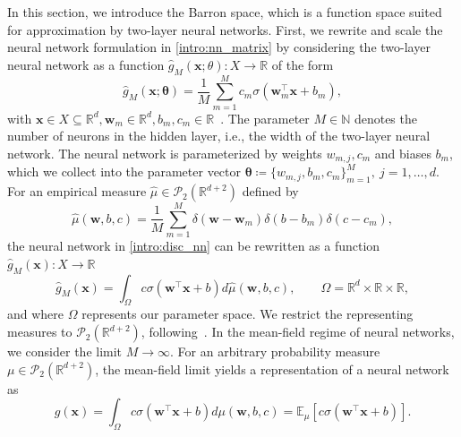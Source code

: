 \documentclass[a4paper, 11pt]{article}
\newcommand{\R}{\mathbb{R}}
\newcommand{\Pw}{\mathcal{P}_{2}\left( \R^{d+2} \right) }
\theoremstyle{plain} %
\begin{document}
	In this section, we introduce the Barron space, which is a function space suited for approximation by two-layer neural networks. First, we rewrite and scale the neural network formulation in \eqref{intro:nn_matrix} by considering the two-layer neural network as a function $\hat{g}_{M}(\bm{x};\theta): X \to \mathbb{R}$ of the form
	\begin{equation}\label{intro:disc_nn}
	\hat{g}_{M}(\bm{x};\bm{\theta}) = \frac{1}{M}\sum_{m=1}^M c_m\sigma(\bm{w}_m^\top \bm{x} + b_m),
	\end{equation}
	with $\bm{x} \in X \subseteq \R^{d}, \bm{w}_{m} \in \R^{d}, b_m, c_m \in \R$~\cite{eBarronSpaceFlowInduced2022}. The parameter $M \in \mathbb{N}$ denotes the number of neurons in the hidden layer, i.e., the width of the two-layer neural network. The neural network is parameterized by weights $w_{m, j}, c_{m}$ and biases $b_{m}$, which we collect into the parameter vector \mbox{$\bm{\theta} \coloneq \{w_{m,j}, b_m, c_m \}_{m=1}^{M},~j=1, \dots, d$}. For an empirical measure $\hat{\mu} \in \mathcal{P}_{2}(\R^{d+2})$ defined by
	\begin{equation}
		\hat{\mu}(\bm{w}, b, c) = \frac{1}{M}\sum_{m=1}^{M} \delta(\bm{w} - \bm{w}_m)\delta(b - b_m)\delta(c - c_m), 
	\end{equation}
	the neural network in \eqref{intro:disc_nn} can be rewritten as a function $ \hat{g}_M(\bm{x}): X \to \R$ 
	\begin{equation}\label{intro:integral_disc_nn}
	\hat{g}_{M}(\bm{x}) = \int_{\Omega} c \sigma(\bm{w}^\top \bm{x} + b) d\hat{\mu}(\bm{w}, b, c), \qquad \Omega = \R^d \times \R \times \R,
	\end{equation}
	and where $\Omega$ represents our parameter space. We restrict the representing measures to $ \Pw$, following~\cite{chizat2020implicit}. In the mean-field regime of neural networks, we consider the limit $M \to \infty$. For an arbitrary probability measure $ \mu \in \Pw $, the mean-field limit yields a representation of a neural network as
	\begin{equation}\label{intro:cont_nn}
			g(\bm{x}) = \int_{\Omega} c \sigma(\bm{w}^\top \bm{x} + b) d\mu(\bm{w}, b, c) = \mathbb{E}_{\mu}\left[ c \sigma(\bm{w}^\top \bm{x} + b)\right].
	\end{equation}
\end{document}
